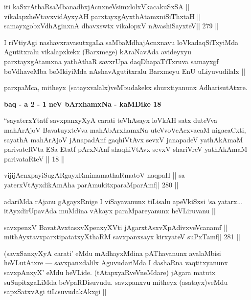 \begin{shl}
iti kaSxrAthaRsaMbanadhxjAcnxneV\s simxlolxVkacakuSxSA ||
vikalapxheVtavxvidAyxyAH parxtayxgAyxthAtamxniSiThxtaH ||
samayxgobxVdhAginxnA dhavxswtx vikalopxV nAvashiSayxteV\hfill || 279 ||
\end{shl}

\begin{artha}
I riVtiyAgi nashavxravasutxgaLa saMbaMdhajAcnxnavu loVkadaqSiTxyiMda Agutitxralu vikalapxkekx (Barxmege) kAraNavAda avideyxyu parxtayxgAtamxna yathAthaR savxrUpa daqDhapaTiTxruva samayxgf boVdhaveMba beMkiyiMda nAshavAgutitxralu Barxmeyu EnU uLiyuvudilalx ||
\end{artha}

\begin{artha}
parxpaMca, mitheyx (satayxvalalx)veMbudakekx shurxtiyanunx AdharisutAtxre.
\end{artha}


\begin{center}
{\large\bf baq - a 2 - 1 neV bArxhamxNa  - kaMDike 18}
\end{center}

\begin{shl}
``sayaterxYtatf savxpanxyXyA carati teVhAsayx loVkAH
satx duteVva mahArAjoV BavatuyxteVva mahAbArxhamxNa
uteVvoVcAcxvacaM nigacaCxti, sayathA mahArAjoV
jAnapadAnf gaqhiVtAvx sevxV janapadeV yathAkAmaM
parivateRVta ESa Etatf pArxNAnf shaqhiVtAvx sevxV
shariVreV yathAkAmaM parivataRteV || 18 ||
\end{shl}

\begin{shl}
vijijAcnxpayiSugARgayxRmimamathaRmatoV naqpaH ||
sa yaterxVtAyxdikAmAha parAmukitxparaMparAmf\hfill || 280 ||
\end{shl}

\begin{artha}
adariMda rAjanu gAgayxRnige I viSayavanunx tiLisalu apeVkiSxsi `sa yatarx... itAyxdirUpavAda muMdina vAkayx paraMpareyanunx heVLiruvanu ||
\end{artha}

\begin{shl}
savxpenxV BavatAvxtasxvXpenxyXVti jAgarxtAsxvXpAdivxveVcanamf ||
mithAyxtavxparxtipatatxyXthaRM savxpanxsayx kirxyateV suPxTamf\hfill || 281 ||
\end{shl}

\begin{artha}
(savxSanxyXyA carati' eMdu mAdhayxMdina pAThavanunx avalaMbisi heVLutAtxre --- savxpanxdalilx AguvudariMda I dashaRna vaqtitxyanunx savxpAnxyX' eMdu heVLide. (tAtapxyaRveVneMdare) jAgara matutx suSupitxgaLiMda beVpaRDisuvudu. savxpanxvu mitheyx (asatayx)veMdu sapxSatxvAgi tiLisuvudakAkxgi ||
\end{artha}

